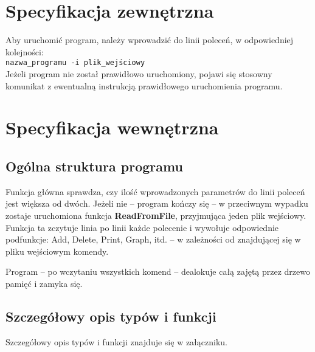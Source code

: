 \section{Specyfikacja zewnętrzna}
\begin{justify}

Aby uruchomić program, należy wprowadzić do linii poleceń, w odpowiedniej kolejności: \\
\indent\texttt{nazwa\_programu -i plik\_wejściowy} \\
Jeżeli program nie został prawidłowo uruchomiony, pojawi się stosowny komunikat z ewentualną instrukcją prawidłowego uruchomienia programu.





\end{justify}

\section{Specyfikacja wewnętrzna}
\begin{justify}

\end{justify}

\subsection{Ogólna struktura programu}
\begin{justify}
Funkcja główna sprawdza, czy ilość wprowadzonych parametrów do linii poleceń jest większa od dwóch. Jeżeli nie – program kończy się – w przeciwnym wypadku zostaje uruchomiona funkcja \textbf{ReadFromFile}, przyjmująca jeden plik wejściowy. Funkcja ta zczytuje linia po linii każde polecenie i wywołuje odpowiednie podfunkcje: Add, Delete, Print, Graph, itd. – w zależności od znajdującej się w pliku wejściowym komendy.

Program – po wczytaniu wszystkich komend – dealokuje całą zajętą przez drzewo pamięć i zamyka się.

\end{justify}

\subsection{Szczegółowy opis typów i funkcji}
\begin{justify}
Szczegółowy opis typów i funkcji znajduje się w załączniku.
\end{justify}

